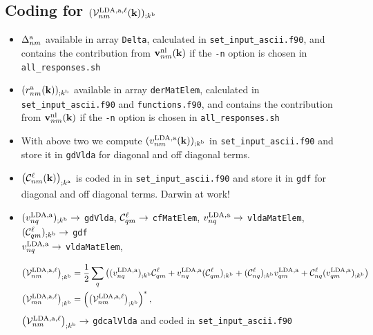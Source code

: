 \subsection{Coding for $({\mathbf{\cal V}}^{\mathrm{LDA},\mathrm{a},\ell}_{nm}(\mathbf{k}))_{;k^{\mathrm{b}}}$}
\begin{itemize}
\item $\Delta^{\mathrm{a}}_{nm}$ available in array \verb=Delta=, 
calculated in \verb=set_input_ascii.f90=,
 and contains the
  contribution from $\mathbf{v}^{\mathrm{nl}}_{nm}(\mathbf{k})$ if the \verb=-n= option is
  chosen in \verb=all_responses.sh= 
\item $(r^{\mathrm{a}}_{nm}(\mathbf{k}))_{;k^{\mathrm{b}}}$
 available in array
  \verb=derMatElem=,
calculated in \verb=set_input_ascii.f90= and \verb=functions.f90=,
 and contains the
  contribution from $\mathbf{v}^{\mathrm{nl}}_{nm}(\mathbf{k})$ if the \verb=-n= option is
  chosen in \verb=all_responses.sh= 
\item With above two we compute $(v^{\mathrm{LDA},\mathrm{a}}_{nm}(\mathbf{k}))_{;k^{\mathrm{b}}}$ 
in \verb=set_input_ascii.f90=  and store it in \verb=gdVlda= for
diagonal and off diagonal terms.
\item $\big({\mathbf{\cal C}}^\ell_{nm}(\mathbf{k})\big)_{;k^{\mathrm{a}}}$ is coded in 
in \verb=set_input_ascii.f90=  and store it in \verb=gdf= for
diagonal and off diagonal terms. Darwin at work!
\item $(v^{\mathrm{LDA},\mathrm{a}}_{nq})_{;k^{\mathrm{b}}}\to$ \verb=gdVlda=,
  ${\mathbf{\cal C}}^\ell_{qm}\to$ \verb=cfMatElem=,
$v^{\mathrm{LDA},\mathrm{a}}_{nq}\to$ \verb=vldaMatElem=, 
$({\mathbf{\cal C}}^\ell_{qm})_{;k^{\mathrm{b}}}\to$
\verb=gdf=\\
 $v^{\mathrm{LDA},\mathrm{a}}_{nq}\to$ \verb=vldaMatElem=,

 \begin{align}\label{c-a.2nn}
\left({\mathbf{\cal V}}^{\mathrm{LDA},\mathrm{a},\ell}_{nm}\right)_{;k^{\mathrm{b}}}
&=
\frac{1}{2}\sum_q\left(
(v^{\mathrm{LDA},\mathrm{a}}_{nq})_{;k^{\mathrm{b}}}{\mathbf{\cal C}}^\ell_{qm}
+ 
v^{\mathrm{LDA},\mathrm{a}}_{nq}({\mathbf{\cal C}}^\ell_{qm})_{;k^{\mathrm{b}}}
+
({\mathbf{\cal C}}^\ell_{nq})_{;k^{\mathrm{b}}} v^{\mathrm{LDA},\mathrm{a}}_{qm}
+
{\mathbf{\cal C}}^\ell_{nq} (v^{\mathrm{LDA},\mathrm{a}}_{qm})_{;k^{\mathrm{b}}}
\right)
\nonumber\\
\left({\mathbf{\cal V}}^{\mathrm{LDA},\mathrm{a},\ell}_{mn}\right)_{;k^{\mathrm{b}}}&=\left(\left({\mathbf{\cal V}}^{\mathrm{LDA},\mathrm{a},\ell}_{nm}\right)_{;k^{\mathrm{b}}}\right)^*
,
\end{align} 
$\left({\mathbf{\cal V}}^{\mathrm{LDA},\mathrm{a},\ell}_{nm}\right)_{;k^{\mathrm{b}}}\to$
\verb=gdcalVlda= and coded in \verb=set_input_ascii.f90=
\end{itemize}


